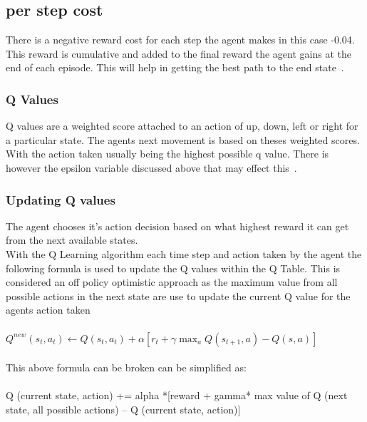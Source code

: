 \subsection{per step cost}
There is a negative reward cost for each step the agent makes in this case -0.04.
This reward is cumulative and  added to the final reward the agent gains at the end of each episode. This will help in getting the best path to the end state~\cite{LITTMAN1994157}.
\subsubsection{Q Values}
 Q values are a weighted score attached to an action of up, down, left or right for a particular state.
 The agents next movement is based on theses weighted scores. With the action taken usually being the highest possible q value. There is however the epsilon variable discussed above that may effect this~\cite{LITTMAN1994157}.

\subsubsection{Updating Q values}
The agent chooses it's action decision based on what highest reward it can get from the next available states.\\

With the Q Learning algorithm each time step and action taken by the agent the following formula is used to update the Q values within the Q Table. This is considered an off policy optimistic approach as the maximum value from all possible actions in the next state are use to update the current Q value for the agents action taken~\cite{Watkins1992}\\\\
$ Q^{new}(s_{t},a_{t})\leftarrow Q(s_{t},a_{t}) + \alpha[r_{t} + \gamma  \max _{a}Q(s_{t+1},a) - Q(s, a)]$~\cite{Qlearnin52:online}\\\\
This above formula can be broken can be simplified as:\\\\
Q (current state, action) += alpha *[reward + gamma* max value of Q (next state, all possible actions) – Q (current state, action)]\\\\

